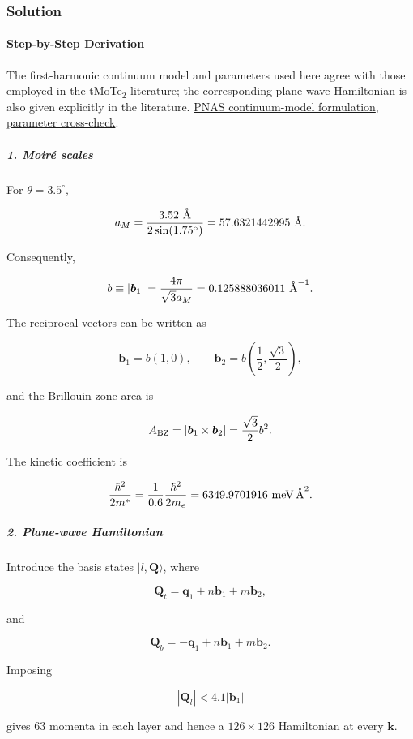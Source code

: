 \subsubsection*{Solution}
\paragraph*{Step-by-Step Derivation}

The first-harmonic continuum model and parameters used here agree with those employed in the tMoTe$_2$ literature; the corresponding plane-wave Hamiltonian is also given explicitly in the literature. \href{\detokenize{https://pmc.ncbi.nlm.nih.gov/articles/PMC10895274/}}{PNAS continuum-model formulation}, \href{\detokenize{https://www.nature.com/articles/s42005-025-02483-6}}{parameter cross-check}.

\subparagraph*{1. Moiré scales}

For $\theta=3.5^\circ$,

\[
a_M=\frac{3.52\ {\rm \text{\AA}}} {2\sin(1.75^\circ)} =57.6321442995\ {\rm \text{\AA}}.
\]

Consequently,

\[
b\equiv |\boldsymbol b_1| =\frac{4\pi}{\sqrt{3}a_M} =0.125888036011\ {\rm \text{\AA}}^{-1}.
\]

The reciprocal vectors can be written as

\[
\boldsymbol b_1=b(1,0),\qquad \boldsymbol b_2=b\left(\frac12,\frac{\sqrt3}{2}\right),
\]

and the Brillouin-zone area is

\[
A_{\rm BZ} = |\boldsymbol b_1\times\boldsymbol b_2| = \frac{\sqrt3}{2}b^2.
\]

The kinetic coefficient is

\[
\frac{\hbar^2}{2m^*} = \frac{1}{0.6}\frac{\hbar^2}{2m_e} = 6349.9701916\ {\rm meV\,\text{\AA}^2}.
\]

\subparagraph*{2. Plane-wave Hamiltonian}

Introduce the basis states $|l,\boldsymbol Q\rangle$, where

\[
\boldsymbol Q_t=\boldsymbol q_1+n\boldsymbol b_1+m\boldsymbol b_2,
\]

and

\[
\boldsymbol Q_b=-\boldsymbol q_1+n\boldsymbol b_1+m\boldsymbol b_2.
\]

Imposing

\[
|\boldsymbol Q_l|<4.1|\boldsymbol b_1|
\]

gives $63$ momenta in each layer and hence a $126\times126$ Hamiltonian at every $\boldsymbol k$.

